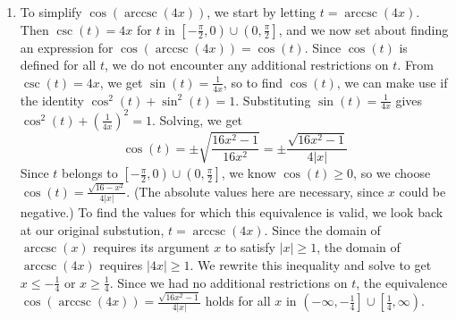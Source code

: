 {\begin{enumerate}
\begin{enumerate}
\[ 
\tan(t) = \left\{\begin{array}{rr} \sqrt{x^2-1}, & \text{ if } 0 \leq t < \frac{\pi}{2} \\ [5pt] -\sqrt{x^2-1}, & \text{ if } \frac{\pi}{2} < t \leq \pi  \end{array}\right. 
\]

Now we need to determine what these conditions on $t$ mean for $x$.  Since $x = \sec(t)$, when $0 \leq t < \frac{\pi}{2}$, $x \geq 1$, and when $\frac{\pi}{2} < t \leq \pi$, $x \leq -1$.  Since we encountered no further restrictions on $t$, the  equivalence below holds for all $x$ in $(-\infty, -1] \cup [1, \infty)$.

\[ \tan(\operatorname{arcsec}(x)) = \left\{ \begin{array}{rr} \sqrt{x^2-1}, & \text{if $x \geq 1$} \\[5pt]  -\sqrt{x^2-1}, & \text{if $x \leq -1$}  \end{array}\right. \]



\item  To simplify $\cos(\operatorname{arccsc}(4x))$, we start by letting $t = \operatorname{arccsc}(4x)$.   Then $\csc(t) = 4x$ for $t$ in $\left[-\frac{\pi}{2}, 0 \right) \cup \left(0, \frac{\pi}{2}\right]$, and we now set about finding an expression for  $\cos(\operatorname{arccsc}(4x)) = \cos(t)$.  Since $\cos(t)$ is defined for all $t$, we do not encounter any additional restrictions on $t$.  From $\csc(t) = 4x$, we get $\sin(t) = \frac{1}{4x}$, so to find $\cos(t)$, we can make use if the identity $\cos^{2}(t) + \sin^{2}(t) = 1$.  Substituting $\sin(t) = \frac{1}{4x}$  gives $\cos^{2}(t) + \left(\frac{1}{4x}\right)^2 = 1$.  Solving, we get \[\cos(t) = \pm \sqrt{\frac{16x^2-1}{16x^2}} = \pm \frac{\sqrt{16x^2-1}}{4|x|}\]  Since $t$ belongs to $\left[-\frac{\pi}{2}, 0 \right) \cup \left(0, \frac{\pi}{2}\right]$, we know $\cos(t) \geq 0$, so we choose $\cos(t) = \frac{\sqrt{16-x^2}}{4|x|}$. (The absolute values here are necessary, since $x$ could be negative.)  To find the values for which this equivalence is valid, we look back at our original substution,  $t = \operatorname{arccsc}(4x)$.  Since the domain of $\operatorname{arccsc}(x)$ requires its argument $x$ to satisfy $|x| \geq 1$, the domain of $\operatorname{arccsc}(4x)$ requires $|4x| \geq 1$.  We rewrite this inequality and solve to get $x \leq -\frac{1}{4}$ or $x \geq \frac{1}{4}$.  Since we had no additional restrictions on $t$, the equivalence  $\cos(\operatorname{arccsc}(4x)) = \frac{\sqrt{16x^2-1}}{4|x|}$  holds for all $x$ in $\left(-\infty, -\frac{1}{4} \right] \cup \left[\frac{1}{4}, \infty \right)$.  

\end{enumerate}

\end{enumerate}
}

